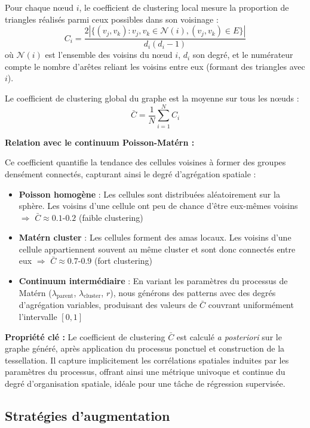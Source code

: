 Pour chaque nœud $i$, le coefficient de clustering local mesure la proportion de triangles réalisés parmi ceux possibles dans son voisinage :
\[
C_i = \frac{2|\{(v_j, v_k) : v_j, v_k \in \mathcal{N}(i), (v_j, v_k) \in E\}|}{d_i(d_i-1)}
\]
où $\mathcal{N}(i)$ est l'ensemble des voisins du nœud $i$, $d_i$ son degré, et le numérateur compte le nombre d'arêtes reliant les voisins entre eux (formant des triangles avec $i$).

Le coefficient de clustering global du graphe est la moyenne sur tous les nœuds :
\[
\bar{C} = \frac{1}{N}\sum_{i=1}^N C_i
\]

\textbf{Relation avec le continuum Poisson-Matérn :}

Ce coefficient quantifie la tendance des cellules voisines à former des groupes densément connectés, capturant ainsi le degré d'agrégation spatiale :

\begin{itemize}
    \item \textbf{Poisson homogène} : Les cellules sont distribuées aléatoirement sur la sphère. Les voisins d'une cellule ont peu de chance d'être eux-mêmes voisins $\Rightarrow$ $\bar{C} \approx 0.1$-$0.2$ (faible clustering)
    
    \item \textbf{Matérn cluster} : Les cellules forment des amas locaux. Les voisins d'une cellule appartiennent souvent au même cluster et sont donc connectés entre eux $\Rightarrow$ $\bar{C} \approx 0.7$-$0.9$ (fort clustering)
    
    \item \textbf{Continuum intermédiaire} : En variant les paramètres du processus de Matérn ($\lambda_{\text{parent}}$, $\lambda_{\text{cluster}}$, $r$), nous générons des patterns avec des degrés d'agrégation variables, produisant des valeurs de $\bar{C}$ couvrant uniformément l'intervalle $[0, 1]$
\end{itemize}

\textbf{Propriété clé :} Le coefficient de clustering $\bar{C}$ est calculé \textit{a posteriori} sur le graphe généré, après application du processus ponctuel et construction de la tessellation. Il capture implicitement les corrélations spatiales induites par les paramètres du processus, offrant ainsi une métrique univoque et continue du degré d'organisation spatiale, idéale pour une tâche de régression supervisée.

\subsection{Stratégies d'augmentation}

